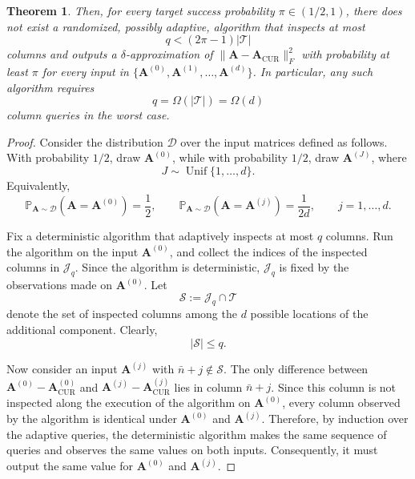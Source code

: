 \documentclass[11pt]{article}
\newtheorem{theorem}{Theorem}
\begin{document}
\begin{theorem}
    Then, for every target success probability $\pi\in(1/2,1)$, there does not
    exist a randomized, possibly adaptive, algorithm that inspects at most
    \begin{equation}
        q < (2\pi-1)|\mathcal{T}|
    \end{equation}
    columns and outputs a $\delta$-approximation of
    $\|\mathbf{A}-\mathbf{A}_{\mathrm{CUR}}\|_F^2$ with probability at least
    $\pi$ for every input in
    $\{\mathbf{A}^{(0)},\mathbf{A}^{(1)},\ldots,\mathbf{A}^{(d)}\}$.
    In particular, any such algorithm requires
    $$
        q=\Omega(|\mathcal{T}|)=\Omega(d)
    $$
    column queries in the worst case.
\end{theorem}

\begin{proof}
    Consider the distribution $\mathcal{D}$ over the input matrices defined as
    follows. With probability $1/2$, draw $\mathbf{A}^{(0)}$, while with
    probability $1/2$, draw $\mathbf{A}^{(J)}$, where
    \begin{equation}
        J\sim\operatorname{Unif}\{1,\ldots,d\}.
    \end{equation}
    Equivalently,
    \begin{equation}
        \mathbb{P}_{\mathbf{A}\sim\mathcal{D}}
        \left(\mathbf{A}=\mathbf{A}^{(0)}\right)
        =\frac{1}{2},
        \qquad
        \mathbb{P}_{\mathbf{A}\sim\mathcal{D}}
        \left(\mathbf{A}=\mathbf{A}^{(j)}\right)
        =\frac{1}{2d},
        \qquad j=1,\ldots,d.
    \end{equation}

    Fix a deterministic algorithm that adaptively inspects at most $q$ columns.
    Run the algorithm on the input $\mathbf{A}^{(0)}$, and collect the indices
    of the inspected columns in $\mathcal{J}_q$. Since the algorithm is
    deterministic, $\mathcal{J}_q$ is fixed by the observations made on
    $\mathbf{A}^{(0)}$. Let
    \begin{equation}
        \mathcal{S}
        :=
        \mathcal{J}_q\cap\mathcal{T}
    \end{equation}
    denote the set of inspected columns among the $d$ possible locations of the
    additional component. Clearly,
    \begin{equation}
        |\mathcal{S}|\leq q.
    \end{equation}

    Now consider an input $\mathbf{A}^{(j)}$ with
    $\bar n+j\notin\mathcal{S}$. The only difference between
    $\mathbf{A}^{(0)}-\mathbf{A}^{(0)}_{\mathrm{CUR}}$ and
    $\mathbf{A}^{(j)}-\mathbf{A}^{(j)}_{\mathrm{CUR}}$ lies in column
    $\bar n+j$. Since this column is not inspected along the execution of the
    algorithm on $\mathbf{A}^{(0)}$, every column observed by the algorithm is
    identical under $\mathbf{A}^{(0)}$ and $\mathbf{A}^{(j)}$. Therefore, by
    induction over the adaptive queries, the deterministic algorithm makes the
    same sequence of queries and observes the same values on both inputs.
    Consequently, it must output the same value for $\mathbf{A}^{(0)}$ and
    $\mathbf{A}^{(j)}$.


\end{proof}
\end{document}
